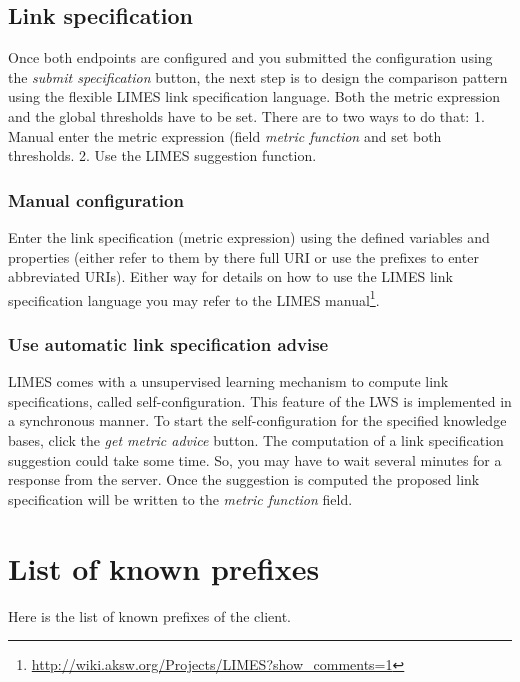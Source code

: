 \documentclass{article}
\begin{document}
\subsection{Link specification}
Once both endpoints are configured and you submitted the configuration using the \textit{submit specification}  button, the next step is to design the comparison pattern using the flexible LIMES link specification language. Both the metric expression and the global thresholds have to be set. There are to two ways to do that: 1. Manual enter the metric expression (field \textit{metric function} and set both thresholds. 2. Use the LIMES suggestion function.\\
\subsubsection{Manual configuration}
Enter the link specification (metric expression) using the defined variables and properties (either refer to them by there full URI or use the prefixes to enter abbreviated URIs). Either way for details on how to use the LIMES link specification language you may refer to the LIMES manual\footnote{\url{http://wiki.aksw.org/Projects/LIMES?show_comments=1}}.
\subsubsection{Use automatic link specification advise}
LIMES comes with a unsupervised learning mechanism to compute link specifications, called self-configuration. This feature of the LWS is implemented in a synchronous manner. To start the self-configuration for the specified knowledge bases, click the \textit{get metric advice} button. The computation of a link specification suggestion could take some time. So, you may have to wait several minutes for a response from the server. Once the suggestion is computed the proposed link specification will be written to the \textit{metric function} field.

\appendix
\section{List of known prefixes}
Here is the list of known prefixes of the client.
\end{document}
